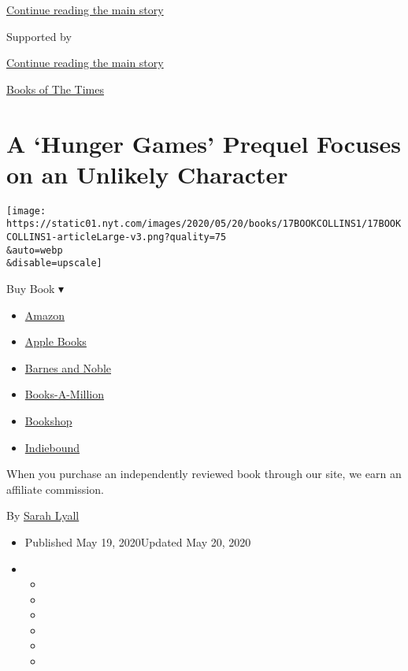 \protect\hyperlink{after-top}{Continue reading the main story}

Supported by

\protect\hyperlink{after-sponsor}{Continue reading the main story}

\href{/column/books-of-the-times}{Books of The Times}

\hypertarget{a-hunger-games-prequel-focuses-on-an-unlikely-character}{%
\section{A `Hunger Games' Prequel Focuses on an Unlikely
Character}\label{a-hunger-games-prequel-focuses-on-an-unlikely-character}}

\texttt{[image: https://static01.nyt.com/images/2020/05/20/books/17BOOKCOLLINS1/17BOOKCOLLINS1-articleLarge-v3.png?quality=75\\\&auto=webp\\\&disable=upscale]}

Buy Book ▾

\begin{itemize}
\tightlist
\item
  \href{https://www.amazon.com/gp/search?index=books\&tag=NYTBSREV-20\&field-keywords=The+Ballad+of+Songbirds+and+Snakes+Suzanne+Collins}{Amazon}
\item
  \href{https://du-gae-books-dot-nyt-du-prd.appspot.com/buy?title=The+Ballad+of+Songbirds+and+Snakes\&author=Suzanne+Collins}{Apple
  Books}
\item
  \href{https://www.anrdoezrs.net/click-7990613-11819508?url=https\%3A\%2F\%2Fwww.barnesandnoble.com\%2Fw\%2F\%3Fean\%3D9781338635171}{Barnes
  and Noble}
\item
  \href{https://www.anrdoezrs.net/click-7990613-35140?url=https\%3A\%2F\%2Fwww.booksamillion.com\%2Fp\%2FThe\%2BBallad\%2Bof\%2BSongbirds\%2Band\%2BSnakes\%2FSuzanne\%2BCollins\%2F9781338635171}{Books-A-Million}
\item
  \href{https://bookshop.org/a/3546/9781338635171}{Bookshop}
\item
  \href{https://www.indiebound.org/book/9781338635171?aff=NYT}{Indiebound}
\end{itemize}

When you purchase an independently reviewed book through our site, we
earn an affiliate commission.

By \href{https://www.nytimes.com/by/sarah-lyall}{Sarah Lyall}

\begin{itemize}
\item
  Published May 19, 2020Updated May 20, 2020
\item
  \begin{itemize}
  \item
  \item
  \item
  \item
  \item
  \item
  \end{itemize}
\end{itemize}

